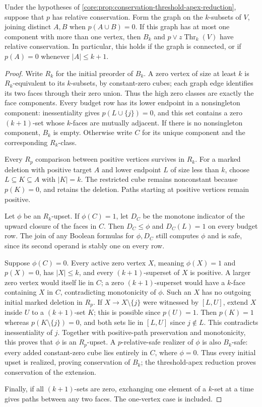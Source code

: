 \begin{corollary}
\label{core:cor:conservation-connected-zero-faces}
Under the hypotheses of \cref{core:prop:conservation-threshold-apex-reduction},
suppose that $p$ has relative conservation. Form the graph on the
$k$-subsets of $V$, joining distinct $A,B$ when $p(A\cup B)=0$.
If this graph has at most one component with more than one vertex, then
$B_k$ and $p\lor z\operatorname{Thr}_k(V)$ have relative conservation.
In particular, this holds if the graph is connected, or if
$p(A)=0$ whenever $|A|\leq k+1$.
\end{corollary}
\begin{proof}
Write $R_k$ for the initial preorder of $B_k$. A zero vertex of size at
least $k$ is $R_k$-equivalent to its $k$-subsets, by constant-zero cubes;
each graph edge identifies its two faces through their zero union.
Thus the high zero classes are exactly the face components.
Every budget row has its lower endpoint in a nonsingleton component:
inessentiality gives $p(L\cup\{j\})=0$, and this set contains a zero
$(k+1)$-set whose $k$-faces are mutually adjacent.
If there is no nonsingleton component, $B_k$ is empty. Otherwise write
$C$ for its unique component and the corresponding $R_k$-class.

Every $R_p$ comparison between positive vertices survives in $R_k$.
For a marked deletion with positive target $A$ and lower endpoint $L$
of size less than $k$, choose $L\subseteq K\subseteq A$ with $|K|=k$.
The restricted cube remains nonconstant because $p(K)=0$, and retains
the deletion. Paths starting at positive vertices remain positive.

Let $\phi$ be an $R_k$-upset. If $\phi(C)=1$, let $D_C$ be the monotone
indicator of the upward closure of the faces in $C$. Then $D_C\leq\phi$
and $D_C(L)=1$ on every budget row. The join of any Boolean formulas
for $\phi,D_C$ still computes $\phi$ and is safe, since its second
operand is stably one on every row.

Suppose $\phi(C)=0$. Every active zero vertex $X$, meaning
$\phi(X)=1$ and $p(X)=0$, has $|X|\leq k$, and every $(k+1)$-superset
of $X$ is positive. A larger zero vertex would itself lie in $C$;
a zero $(k+1)$-superset would have a $k$-face containing $X$ in $C$,
contradicting monotonicity of $\phi$.
Such an $X$ has no outgoing initial marked deletion in $R_p$.
If $X\to X\setminus\{j\}$
were witnessed by $[L,U]$, extend $X$ inside $U$ to a $(k+1)$-set $K$;
this is possible since $p(U)=1$. Then $p(K)=1$ whereas
$p(K\setminus\{j\})=0$, and both sets lie in $[L,U]$ since
$j\notin L$. This contradicts inessentiality of $j$.
Together with positive-path preservation and monotonicity, this proves
that $\phi$ is an $R_p$-upset.
A $p$-relative-safe realizer of $\phi$ is also $B_k$-safe: every added
constant-zero cube lies entirely in $C$, where $\phi=0$.
Thus every initial upset is realized, proving conservation of $B_k$;
the threshold-apex reduction proves conservation of the extension.

Finally, if all $(k+1)$-sets are zero, exchanging one element of a
$k$-set at a time gives paths between any two faces. The one-vertex
case is included.
\end{proof}

